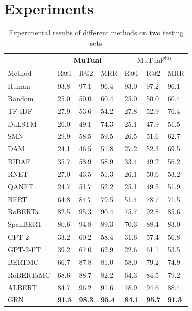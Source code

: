 \documentclass[letterpaper]{article} %
\begin{document}
\section{Experiments}
\begin{table}[t]
\centering
\begin{tabular}{p{1.9cm}|p{0.6cm}|p{0.6cm}|p{0.6cm}|p{0.6cm}|p{0.6cm}|p{0.6cm}}  %
\hline
   & \multicolumn{3}{c|}{MuTual} & \multicolumn{3}{c}{$ \text{MuTual}^{plus}$} \\ \hline
   Method & R@1 &R@2 & MRR & R@1 &R@2 & MRR \\ \hline
   Human & 93.8 & 97.1 & 96.4  & 93.0 & 97.2 & 96.1 \\ \hline
   Random  & 25.0 & 50.0 & 60.4 & 25.0 & 50.0 & 60.4  \\ \hline
   TF-IDF & 27.9 & 53.6 & 54.2 & 27.8 & 52.9 & 76.4  \\
   DuLSTM & 26.0 & 49.1 & 74.3 & 25.1 & 47.9 & 51.5  \\
   SMN & 29.9 & 58.5 & 59.5 & 26.5 & 51.6 & 62.7 \\
   DAM & 24.1 & 46.5 & 51.8 & 27.2 & 52.3 & 69.5  \\ \hline
   BIDAF & 35.7 & 58.9 &58.9 & 33.4 & 49.2 & 56.2 \\
   RNET & 27.0 & 43.5 & 51.3 & 26.1 & 50.6 & 53.2 \\
   QANET &24.7 &51.7  & 52.2 & 25.1 & 49.5 & 51.9 \\ \hline
   BERT  & 64.8 & 84.7 & 79.5 &  51.4 & 78.7 & 71.5 \\
   RoBERTa & 82.5 & 95.3 & 90.4 & 75.7 & 92.8 & 85.6\\
   SpanBERT & 80.6 & 94.8 & 89.3 & 70.3 & 88.4 & 83.0\\
   GPT-2 & 33.2 & 60.2 & 58.4  & 31.6 & 57.4 & 56.8  \\
   GPT-2-FT  & 39.2 & 67.0 & 62.9 & 22.6 & 61.1 & 53.5  \\
   BERTMC  & 66.7 & 87.8 & 81.0 & 58.0 & 79.2 & 74.9 \\
   RoBERTaMC & 68.6 & 88.7 & 82.2 & 64.3 & 84.5 & 79.2  \\
   ALBERT & 84.7 & 96.2 & 91.6 &  78.9 & 94.6 & 88.4 \\ \hline
   GRN  & \textbf{91.5} & \textbf{98.3} & \textbf{95.4} & \textbf{84.1} & \textbf{95.7} & \textbf{91.3} \\ \hline
\end{tabular}
\caption{Experimental results of different methods on two testing sets}
\label{compared_results}
\end{table}
\end{document}
